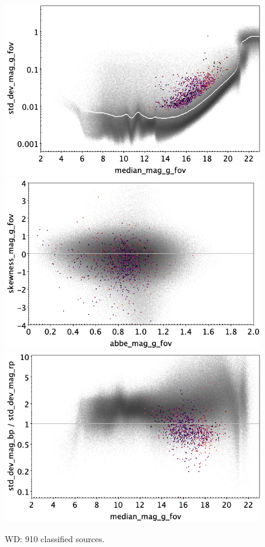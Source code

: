 \documentclass[longauth]{aa}
\begin{document}
\begin{appendix}
\begin{figure}
\hspace{2mm}
 \includegraphics[width=0.45\hsize]{figures/appendix/WD_cls_msd.png} \\ %
\vspace{4mm}
 \includegraphics[width=0.45\hsize]{figures/appendix/WD_cls_ask.png}  %
\hspace{2mm}
 \includegraphics[width=0.45\hsize]{figures/appendix/WD_cls_msdr.png}  \\ %
\vspace{4mm}
 \caption{WD: 910 classified sources.}  
 \label{fig:app:WD}
\end{figure}


\end{appendix}
\end{document}
